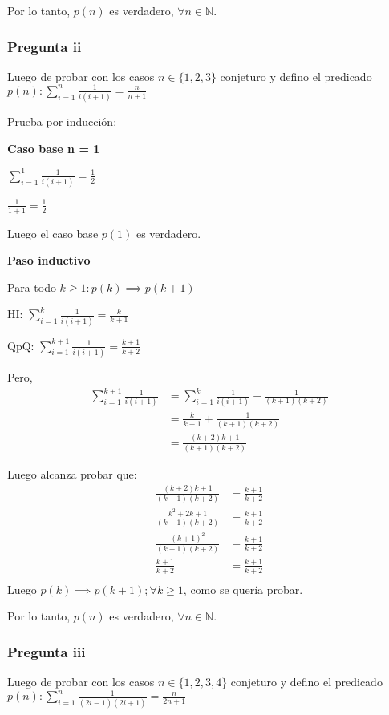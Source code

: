 Por lo tanto, $p(n)$ es verdadero, $\forall n \in \mathbb{N}$.

\subsubsection{Pregunta ii}

Luego de probar con los casos $n \in \{ 1,2,3 \}$ conjeturo y defino el predicado $p(n): \sum_{i=1}^{n}\frac{1}{i(i+1)} = \frac{n}{n+1}$

Prueba por inducción:

\textbf{Caso base n = 1}

$\sum_{i=1}^{1}\frac{1}{i(i+1)} = \frac{1}{2}$

$ \frac{1}{1+1} = \frac{1}{2} $

Luego el caso base $p(1)$ es verdadero.

\textbf{Paso inductivo}

Para todo $k \geq 1: p(k) \implies p(k+1)$

HI: $\sum_{i=1}^{k}\frac{1}{i(i+1)} = \frac{k}{k+1}$

QpQ: $\sum_{i=1}^{k+1}\frac{1}{i(i+1)} = \frac{k+1}{k+2}$

Pero,
\begin{align*}
    \sum_{i=1}^{k+1}\frac{1}{i(i+1)} &= \sum_{i=1}^{k}\frac{1}{i(i+1)} + \frac{1}{(k+1)(k+2)} \\
    &= \frac{k}{k+1} + \frac{1}{(k+1)(k+2)} \\
    &= \frac{(k+2)k + 1}{(k+1)(k+2)}
\end{align*}

Luego alcanza probar que:
\begin{align*}
    \frac{(k+2)k + 1}{(k+1)(k+2)} &= \frac{k+1}{k+2} \\
    \frac{k^2 + 2k + 1}{(k+1)(k+2)} &= \frac{k+1}{k+2} \\
    \frac{(k+1)^2}{(k+1)(k+2)} &= \frac{k+1}{k+2} \\
    \frac{k+1}{k+2} &= \frac{k+1}{k+2} \\
\end{align*}
Luego $p(k) \implies p(k+1); \forall k \geq 1$, como se quería probar.

Por lo tanto, $p(n)$ es verdadero, $\forall n \in \mathbb{N}$.

\subsubsection{Pregunta iii}

Luego de probar con los casos $n \in \{ 1,2,3,4 \}$ conjeturo y defino el predicado $p(n): \sum_{i=1}^{n}\frac{1}{(2i-1)(2i+1)} = \frac{n}{2n+1}$

